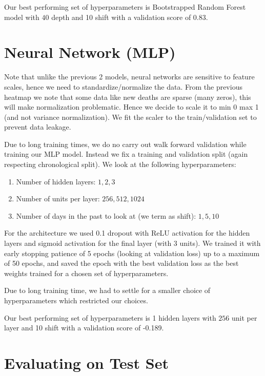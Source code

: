 \documentclass{article}
\begin{document}
Our best performing set of hyperparameters is Bootstrapped Random Forest model with $40$ depth and 10 shift with a validation score of 0.83.

\clearpage

\section{Neural Network (MLP)}

Note that unlike the previous 2 models, neural networks are sensitive to feature scales, hence we need to standardize/normalize the data. From the previous heatmap we note that some data like new deaths are sparse (many zeros), this will make normalization problematic. Hence we decide to scale it to min 0 max 1 (and not variance normalization). We fit the scaler to the train/validation set to prevent data leakage.

Due to long training times, we do no carry out walk forward validation while training our MLP model. Instead we fix a training and validation split (again respecting chronological split). We look at the following hyperparameters:

\begin{enumerate}
\item Number of hidden layers: $1, 2, 3$
\item Number of units per layer: $256, 512, 1024$
\item Number of days in the past to look at (we term as shift): $1, 5, 10$
\end{enumerate}

For the architecture we used 0.1 dropout with ReLU activation for the hidden layers and sigmoid activation for the final layer (with 3 units). We trained it with early stopping patience of 5 epochs (looking at validation loss) up to a maximum of 50 epochs, and saved the epoch with the best validation loss as the best weights trained for a chosen set of hyperparameters. 

Due to long training time, we had to settle for a smaller choice of hyperparameters which restricted our choices. 

Our best performing set of hyperparameters is 1 hidden layers with $256$ unit per layer and 10 shift with a validation score of -0.189. 

\clearpage

\section{Evaluating on Test Set}
\end{document}
